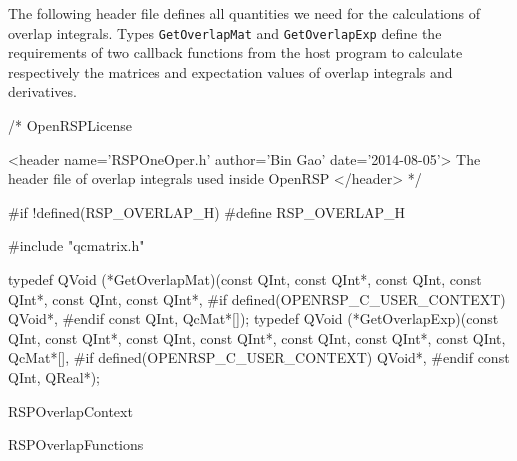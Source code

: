 The following header file defines all quantities we need for the calculations
of overlap integrals. Types {\tt{}GetOverlapMat} and {\tt{}GetOverlapExp} define the
requirements of two callback functions from the host program to calculate
respectively the matrices and expectation values of overlap integrals and
derivatives.

\nwenddocs{}\endmoddef
/*
  \LA{}OpenRSPLicense~{\nwtagstyle{}}\RA{}

  <header name='RSPOneOper.h' author='Bin Gao' date='2014-08-05'>
    The header file of overlap integrals used inside OpenRSP
  </header>
*/

#if !defined(RSP_OVERLAP_H)
#define RSP_OVERLAP_H

#include "qcmatrix.h"

typedef QVoid (*GetOverlapMat)(const QInt,
                               const QInt*,
                               const QInt,
                               const QInt*,
                               const QInt,
                               const QInt*,
#if defined(OPENRSP_C_USER_CONTEXT)
                               QVoid*,
#endif
                               const QInt,
                               QcMat*[]);
typedef QVoid (*GetOverlapExp)(const QInt,
                               const QInt*,
                               const QInt,
                               const QInt*,
                               const QInt,
                               const QInt*,
                               const QInt,
                               QcMat*[],
#if defined(OPENRSP_C_USER_CONTEXT)
                               QVoid*,
#endif
                               const QInt,
                               QReal*);

\LA{}RSPOverlapContext~{\nwtagstyle{}}\RA{}

\LA{}RSPOverlapFunctions~{\nwtagstyle{}}\RA{}

